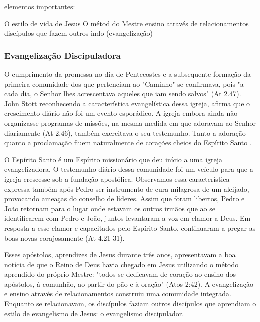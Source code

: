 \documentclass[
	12pt,				%
	openright,			%
	twoside,			%
	a4paper,			%
	english,			%
	french,				%
	spanish,			%
	brazil				%
	]{abntex2}
\begin{document}
{elementos importantes:

O estilo de vida de Jesus 
O métod do Mestre
ensino através de relacionamentos
discípulos que fazem outros
indo (evangelização)


\subsubsection{Evangelização Discipuladora}

O cumprimento da promessa no dia de Pentecostes e a subsequente formação da primeira comunidade dos que pertenciam ao "Caminho" se confirmava, pois "a cada dia, o Senhor lhes acrescentava aqueles que iam sendo salvos" (At 2.47). John Stott reconhecendo a característica evangelística dessa igreja, afirma que o crescimento diário não foi um evento esporádico. A igreja embora ainda não organizasse programas de missões, na mesma medida em que adoravam ao Senhor diariamente (At 2.46), também exercitava o seu testemunho. Tanto a adoração quanto a proclamação fluem naturalmente de corações cheios do Espírito Santo \cite[118-119]{stott}. 

O Espírito Santo é um Espírito missionário que deu início a uma igreja evangelizadora. O testemunho diário dessa comunidade foi um veículo para que a igreja crescesse \cite[78]{stott} sob a fundação apostólica. Observamos essa característica expressa também após Pedro ser instrumento de cura milagrosa de um aleijado, provocando ameaças do conselho de líderes. Assim que foram libertos, Pedro e João retornam para o lugar onde estavam os outros irmãos que ao se identificarem com Pedro e João, juntos levantaram a voz em clamor a Deus. Em resposta a esse clamor e capacitados pelo Espírito Santo, continuaram a pregar as boas novas corajosamente (At 4.21-31).


Esses apóstolos, aprendizes de Jesus durante três anos, apresentavam a boa notícia de que o Reino de Deus havia chegado em Jesus utilizando o método aprendido do próprio Mestre: "todos se dedicavam de coração ao ensino dos apóstolos, à comunhão, ao partir do pão e à oração" (Atos 2:42). A evangelização e ensino através de relacionamentos construiu uma comunidade integrada. Enquanto se relacionavam, os discípulos faziam outros discípulos que aprendiam o estilo de evangelismo de Jesus: o evangelismo discipulador.

}
\end{document}
